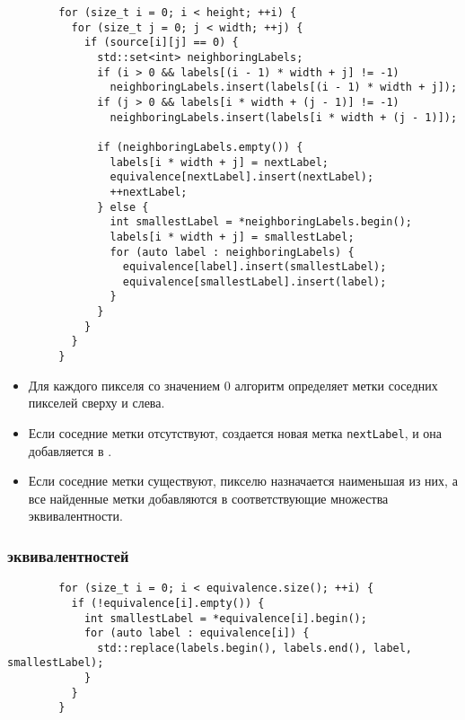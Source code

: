 \documentclass[a4paper, 14pt]{article}
\begin{document}
        \begin{verbatim}
        for (size_t i = 0; i < height; ++i) {
          for (size_t j = 0; j < width; ++j) {
            if (source[i][j] == 0) {
              std::set<int> neighboringLabels;
              if (i > 0 && labels[(i - 1) * width + j] != -1) 
                neighboringLabels.insert(labels[(i - 1) * width + j]);
              if (j > 0 && labels[i * width + (j - 1)] != -1) 
                neighboringLabels.insert(labels[i * width + (j - 1)]);
        
              if (neighboringLabels.empty()) {
                labels[i * width + j] = nextLabel;
                equivalence[nextLabel].insert(nextLabel);
                ++nextLabel;
              } else {
                int smallestLabel = *neighboringLabels.begin();
                labels[i * width + j] = smallestLabel;
                for (auto label : neighboringLabels) {
                  equivalence[label].insert(smallestLabel);
                  equivalence[smallestLabel].insert(label);
                }
              }
            }
          }
        }
        \end{verbatim}
        
        \begin{itemize}
          \item Для каждого пикселя  со значением 0 алгоритм определяет метки соседних пикселей сверху и слева.
          \item Если соседние метки отсутствуют, создается новая метка \texttt{nextLabel}, и она добавляется в .
          \item Если соседние метки существуют, пикселю назначается наименьшая из них, а все найденные метки добавляются в соответствующие множества эквивалентности.
        \end{itemize}
        
        \subsubsection*{ эквивалентностей}
        
        \begin{verbatim}
        for (size_t i = 0; i < equivalence.size(); ++i) {
          if (!equivalence[i].empty()) {
            int smallestLabel = *equivalence[i].begin();
            for (auto label : equivalence[i]) {
              std::replace(labels.begin(), labels.end(), label, smallestLabel);
            }
          }
        }
        \end{verbatim}
        
\end{document}

